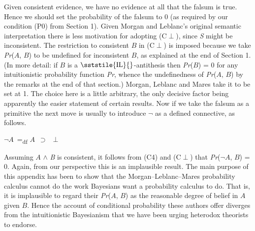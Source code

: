 \noindent Given consistent evidence, we have no evidence at all that the falsum is true. Hence we should set the probability of the falsum to 0 (as required by our condition (P0) from Section 1). Given Morgan and Leblanc's original semantic interpretation there is less motivation for adopting (C${\perp}$), since \textit{S} might be inconsistent. The restriction to consistent \(B\) in (C${\perp}$) is imposed because we take \textit{Pr}(\(A\), \(B\)) to be undefined for inconsistent \(B\), as explained at the end of Section 1. (In more detail: if \(B\) is a {\small \(\sststile{\mathrm{IL}}{}\)}{}-antithesis then \textit{Pr}(\(B\)) = 0 for any intuitionistic probability function \textit{Pr}, whence the undefinedness of \textit{Pr}(\(A\), \(B\)) by the remarks at the end of that section.) Morgan, Leblanc and Mares take it to be set at 1. The choice here is a little arbitrary, the only decisive factor being apparently the easier statement of certain results. Now if we take the falsum as a primitive the next move is usually to introduce ${\lnot}$ as a defined connective, as follows.

\begin{description}
\item ${\lnot}$\(A\)~=\textsubscript{df} \(A\)~${\supset}$~${\perp}$
\end{description}

\noindent Assuming \(A\) ${\wedge}$ \textit{B }is consistent, it follows from (C4) and (C${\perp}$) that \textit{Pr}(${\lnot}$\(A\), \(B\)) = 0. Again, from our perspective this is an implausible result. The main purpose of this appendix has been to show that the Morgan--Leblanc--Mares probability calculus cannot do the work Bayesians want a probability calculus to do. That is, it is implausible to regard their \textit{Pr}(\(A\), \(B\)) as the reasonable degree of belief in \(A\) given \(B\). Hence the account of conditional probability these authors offer diverges from the intuitionistic Bayesianism that we have been urging heterodox theorists to endorse.

